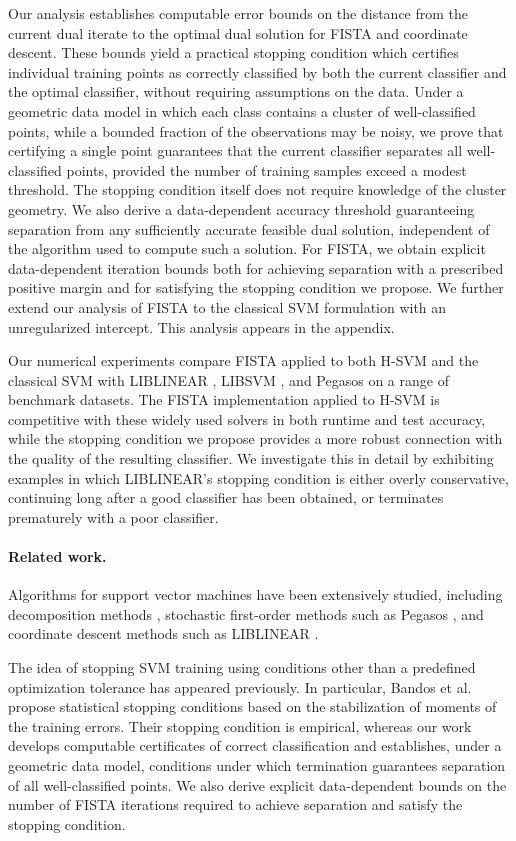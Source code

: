 \documentclass[twoside,11pt]{article}
\begin{document}
Our analysis establishes computable error bounds on the distance from the current dual iterate to the optimal dual solution for FISTA and coordinate descent. These bounds yield a practical stopping condition which certifies individual training points as correctly classified by both the current classifier and the optimal classifier, without requiring assumptions on the data. Under a geometric data model in which each class contains a cluster of well-classified points, while a bounded fraction of the observations may be noisy, we prove that certifying a single point guarantees that the current classifier separates all well-classified points, provided the number of training samples exceed a modest threshold. The stopping condition itself does not require knowledge of the cluster geometry. We also derive a data-dependent accuracy threshold guaranteeing separation from any sufficiently accurate feasible dual solution, independent of the algorithm used to compute such a solution. For FISTA, we obtain explicit data-dependent iteration bounds both for achieving separation with a prescribed positive margin and for satisfying the stopping condition we propose. We further extend our analysis of FISTA to the classical SVM formulation with an unregularized intercept. This analysis appears in the appendix.

Our numerical experiments compare FISTA applied to both H-SVM and the classical SVM with LIBLINEAR \citep{LIBLINEAR}, LIBSVM \citep{LIBSVM}, and Pegasos \citep{Pegasos} on a range of benchmark datasets. The FISTA implementation applied to H-SVM is competitive with these widely used solvers in both runtime and test accuracy, while the stopping condition we propose provides a more robust connection with the quality of the resulting classifier. We investigate this in detail by exhibiting examples in which LIBLINEAR's stopping condition is either overly conservative, continuing long after a good classifier has been obtained, or terminates prematurely with a poor classifier.

\paragraph{Related work.}
Algorithms for support vector machines have been extensively studied, including decomposition methods \citep{Osuna1997,Platt1998,Joachims1998,Fan2005}, stochastic first-order methods such as Pegasos \citep{Pegasos}, and coordinate descent methods such as LIBLINEAR \citep{LIBLINEAR}. 

The idea of stopping SVM training using conditions other than a predefined optimization tolerance has appeared previously. In particular, Bandos et al. \citep{Bandos2007} propose statistical stopping conditions based on the stabilization of moments of the training errors. Their stopping condition is empirical, whereas our work develops computable certificates of correct classification and establishes, under a geometric data model, conditions under which termination guarantees separation of all well-classified points. We also derive explicit data-dependent bounds on the number of FISTA iterations required to achieve separation and satisfy the stopping condition.
\end{document}
